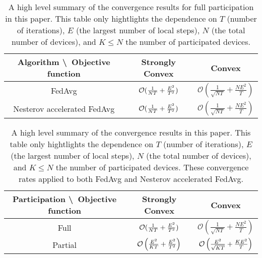 



\begin{table}[h!]
\centering
\begin{tabular}{|c|c|c|}\hline 
	Algorithm \textbackslash\  Objective function        & Strongly Convex        & Convex \\ \hline \hline
	FedAvg                         & ${\mathcal{O}}(\frac{1}{NT}+\frac{E^{2}}{T^{2}})$    &  $\mathcal{O}\left(\frac{1}{\sqrt{NT}}+\frac{NE^{2}}{T}\right)$       \\ \hline
	Nesterov accelerated FedAvg    & ${\mathcal{O}}(\frac{1}{NT}+\frac{E^{2}}{T^{2}})$    & $\mathcal{O}\left(\frac{1}{\sqrt{NT}}+\frac{NE^{2}}{T}\right)$       \\ \hline
\end{tabular}
\caption{A high level summary of the convergence results for full participation in this paper. This table only hightlights the
dependence on $T$ (number of iterations), $E$ (the largest number of local steps), $N$ (the total number of devices), and $K\leq N$ the number of participated devices.}
\label{tb:convergenceratev1}
\end{table}

\begin{table}[h!]
\centering
\begin{tabular}{|c|c|c|}\hline 
	Participation \textbackslash\ Objective function            & Strongly Convex        & Convex \\ \hline \hline
	Full                         & ${\mathcal{O}}(\frac{1}{NT}+\frac{E^{2}}{T^{2}})$    &  $\mathcal{O}\left(\frac{1}{\sqrt{NT}}+\frac{NE^{2}}{T}\right)$       \\ \hline
	Partial                      &  ${\mathcal{O}}\left(\frac{E^{2}}{KT}+\frac{E^{2}}{T^{2}}\right)$   &  ${\mathcal{O}}\left(\frac{E^2}{\sqrt{KT}}+\frac{KE^2}{T} \right)$      \\ \hline
\end{tabular}
\caption{A high level summary of the convergence results in this paper. This table only hightlights the
dependence on $T$ (number of iterations), $E$ (the largest number of local steps), $N$ (the total number of devices), and $K\leq N$ the number of participated devices.
These convergence rates applied to both FedAvg and Nesterov accelerated FedAvg.}
\label{tb:convergenceratev2}
\end{table}



